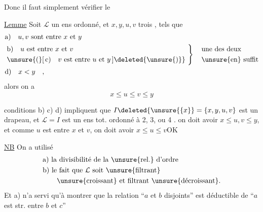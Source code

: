 Donc il faut simplement vérifier le

\uline{Lemme} Soit $\mathcal L$ un ens ordonné, et $x,y,u,v$ trois , tels que
\[
\begin{aligned}
&\text{a)}\quad u,v\text{ sont entre }x\text{ et }y\\
&\left.\begin{aligned}
&\text{b)}\quad u\text{ est entre }x\text{ et }v\\
&\unsure{(}[\,\text{c)}\quad v\text{ est entre }u\text{ et }y\,]\deleted{\unsure{)}}
\end{aligned}\ \right\}\quad
\begin{aligned}&\text{une des deux}\\&\text{\unsure{en} suffit}\end{aligned}\\
&\text{d)}\quad x<y\quad,
\end{aligned}
\]
alors on a
\[
x\leq u\leq v\leq y
\]

\uline{}   conditions b)\unsure{,} c) d) impliquent que $I\deleted{\unsure{\{x}}=\{x,y,u,v\}$ est un drapeau,  et  $\mathcal L=I$ est un ens tot. ordonné  à 2, 3, ou 4 .
    on doit avoir $x\leq u,v\leq y$,  et comme $u$ est entre $x$ et $v$, on doit avoir $x\leq u\leq v$\quad OK

\uline{NB} On a utilisé
\[
\begin{aligned}
&\text{a) la divisibilité de la \unsure{rel.} d'ordre}\\
&\text{b) le fait que }\mathcal L\text{ soit \unsure{filtrant}}\\
&\hspace{2em}\text{\unsure{croissant} et filtrant \unsure{décroissant}.}
\end{aligned}
\]
Et a) n'a servi qu'à montrer que la relation ``$a$ et $b$ disjoints'' est déductible de ``$a$ est str. entre $b$ et $c$''
